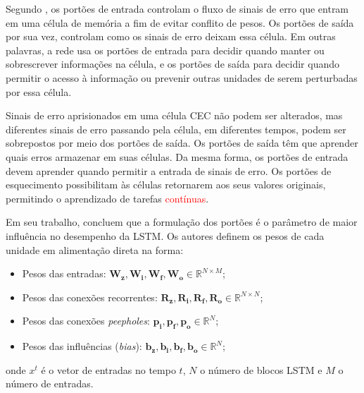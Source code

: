 Segundo , os portões de entrada controlam o fluxo de sinais de erro que entram em uma célula de memória a fim de evitar conflito de pesos. Os portões de saída por sua vez, controlam como os sinais de erro deixam essa célula. Em outras palavras, a rede usa os portões de entrada para decidir quando manter ou sobrescrever informações na célula, e os portões de saída para decidir quando permitir o acesso à informação ou prevenir outras unidades de serem perturbadas por essa célula.

Sinais de erro aprisionados em uma célula CEC não podem ser alterados, mas diferentes sinais de erro passando pela célula, em diferentes tempos, podem ser sobrepostos por meio dos portões de saída. Os portões de saída têm que aprender quais erros armazenar em suas células. Da mesma forma, os portões de entrada devem aprender quando permitir a entrada de sinais de erro. Os portões de esquecimento possibilitam às células retornarem aos seus valores originais, permitindo o aprendizado de tarefas \textcolor{red}{contínuas}. 

Em seu trabalho,  concluem que a formulação dos portões é o parâmetro de maior influência no desempenho da LSTM. Os autores definem os pesos de cada unidade em alimentação direta na forma:
\begin{itemize}
	\item Pesos das entradas: $\mathbf{W_z, W_i, W_f, W_o}\in \mathbb{R}^{N \times M}$;
	\item Pesos das conexões recorrentes: $\mathbf{R_z, R_i, R_f, R_o}\in \mathbb{R}^{N \times N}$;
	\item Pesos das conexões \textit{peepholes}: $\mathbf{p_i, p_f, p_o}\in \mathbb{R}^{N}$;
	\item Pesos das influências (\textit{bias}): $\mathbf{b_z, b_i, b_f, b_o}\in \mathbb{R}^{N}$;
\end{itemize}
onde $x^t$ é o vetor de entradas no tempo $t$, $N$ o número de blocos LSTM e $M$ o número de entradas.

